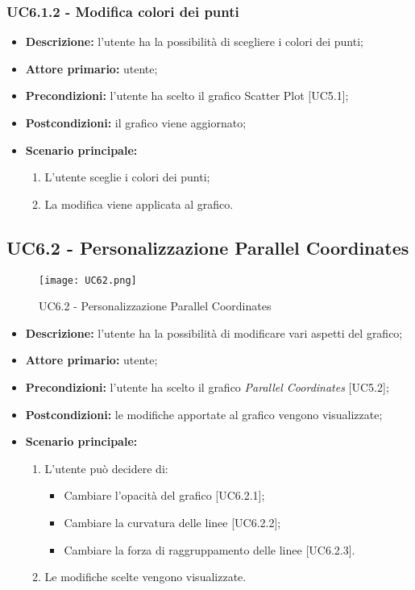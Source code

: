   \subsubsection{UC6.1.2 - Modifica colori dei punti}
  \begin{itemize}
    \item \textbf{Descrizione:} l'utente ha la possibilità di scegliere i colori dei punti;
    \item \textbf{Attore primario:} utente;
    \item \textbf{Precondizioni:} l’utente ha scelto il grafico Scatter Plot [UC5.1];
    \item \textbf{Postcondizioni:} il grafico viene aggiornato;
    \item \textbf{Scenario principale:}
      \begin{enumerate}
      \item L'utente sceglie i colori dei punti;
      \item La modifica viene applicata al grafico.
    \end{enumerate}
  \end{itemize}

\subsection{UC6.2 - Personalizzazione Parallel Coordinates}
\begin{figure}[H]
 \centering
 \texttt{[image: UC62.png]}
 \caption{UC6.2 - Personalizzazione Parallel Coordinates}
\end{figure}
\begin{itemize}
  \item \textbf{Descrizione:} l'utente ha la possibilità di modificare vari aspetti del grafico;
  \item \textbf{Attore primario:} utente;
  \item \textbf{Precondizioni:} l’utente ha scelto il grafico \textit{Parallel Coordinates} [UC5.2];
  \item \textbf{Postcondizioni:} le modifiche apportate al grafico vengono visualizzate;
  \item \textbf{Scenario principale:}
  \begin{enumerate}
    \item L'utente può decidere di:
  \begin{itemize}
    \item Cambiare l'opacità del grafico [UC6.2.1];
    \item Cambiare la curvatura delle linee [UC6.2.2];
    \item Cambiare la forza di raggruppamento delle linee [UC6.2.3].
  \end{itemize}
  \item Le modifiche scelte vengono visualizzate.
\end{enumerate}
\end{itemize}

